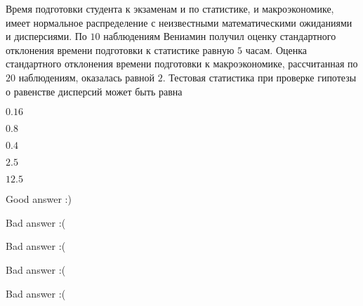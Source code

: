 
\begin{question}
Время подготовки студента к экзаменам и по статистике, и макроэкономике,
имеет нормальное распределение с неизвестными математическими ожиданиями
и дисперсиями. По \(10\) наблюдениям Вениамин получил оценку
стандартного отклонения времени подготовки к статистике равную \(5\)
часам. Оценка стандартного отклонения времени подготовки к
макроэкономике, рассчитанная по \(20\) наблюдениям, оказалась равной
\(2\). Тестовая статистика при проверке гипотезы о равенстве дисперсий
может быть равна
\begin{answerlist}
  \item \(0.16\)
  \item \(0.8\)
  \item \(0.4\)
  \item \(2.5\)
  \item \(12.5\)
\end{answerlist}
\end{question}

\begin{solution}
\begin{answerlist}
  \item Good answer :)
  \item Bad answer :(
  \item Bad answer :(
  \item Bad answer :(
  \item Bad answer :(
\end{answerlist}
\end{solution}

